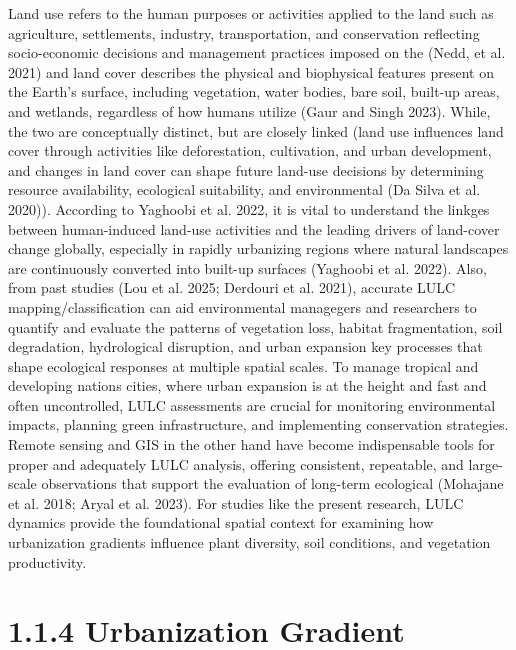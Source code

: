 Land use refers to the human purposes or activities applied to the land such as agriculture, settlements, industry, transportation, and conservation reflecting socio-economic decisions and management practices imposed on the (Nedd, et al. 2021) and land cover describes the physical and biophysical features present on the Earth's surface, including vegetation, water bodies, bare soil, built-up areas, and wetlands, regardless of how humans utilize (Gaur and Singh 2023). While, the two are conceptually distinct, but are closely linked (land use influences land cover through activities like deforestation, cultivation, and urban development, and changes in land cover can shape future land-use decisions by determining resource availability, ecological suitability, and environmental (Da Silva et al. 2020)). According to Yaghoobi et al. 2022, it is vital to understand the linkges between human-induced land-use activities and the leading drivers of land-cover change globally, especially in rapidly urbanizing regions where natural landscapes are continuously converted into built-up surfaces (Yaghoobi et al. 2022).
Also, from past studies (Lou et al. 2025; Derdouri et al. 2021), accurate LULC mapping/classification can aid environmental managegers and researchers to quantify and evaluate the patterns of vegetation loss, habitat fragmentation, soil degradation, hydrological disruption, and urban expansion key processes that shape ecological responses at multiple spatial scales. To manage tropical and developing nations cities, where urban expansion is at the height and fast and often uncontrolled, LULC assessments are crucial for monitoring environmental impacts, planning green infrastructure, and implementing conservation strategies. Remote sensing and GIS in the other hand have become indispensable tools for proper and adequately LULC analysis, offering consistent, repeatable, and large-scale observations that support the evaluation of long-term ecological (Mohajane et al. 2018; Aryal et al. 2023). For studies like the present research, LULC dynamics provide the foundational spatial context for examining how urbanization gradients influence plant diversity, soil conditions, and vegetation productivity.
\hypertarget{urbanization-gradient}{%
\section{\texorpdfstring{\textbf{1.1.4 Urbanization Gradient}}{1.1.4 Urbanization Gradient}}\label{urbanization-gradient}}

